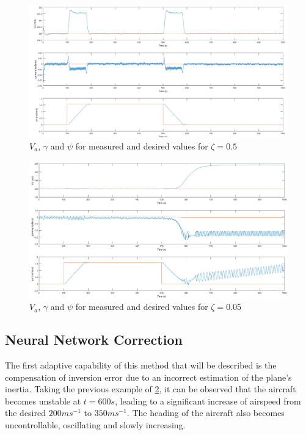 \begin{figure}[H]
\centering
\includegraphics[width=1.1\textwidth]{Figures/Results/ref_zeta_05.png}
\caption[Reference tracking for $\zeta=0.5$]{$V_a$, $\gamma$ and $\psi$ for measured and desired values for $\zeta=0.5$}
\label{fig:ref_zeta_05}
\end{figure}
\begin{figure}[H]
\centering
\includegraphics[width=1.1\textwidth]{Figures/Results/ref_zeta_005.png}
\caption[Reference tracking for $\zeta=0.05$]{$V_a$, $\gamma$ and $\psi$ for measured and desired values for $\zeta=0.05$}
\label{fig:ref_zeta_005}
\end{figure}

\subsection{Neural Network Correction}
The first adaptive capability of this method that will be described is the compensation of inversion error due to an incorrect estimation of the plane's inertia. Taking the previous example of \ref{fig:ref_zeta_005}, it can be observed that the aircraft becomes unstable at $t=600s$, leading to a significant increase of airspeed from the desired $200ms^{-1}$ to $350ms^{-1}$. The heading of the aircraft also becomes uncontrollable, oscillating and slowly increasing. 

